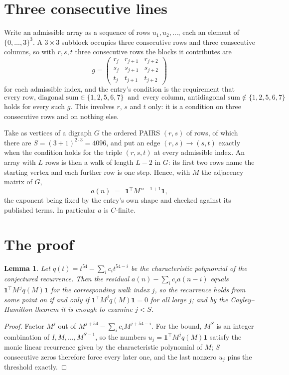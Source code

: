 \documentclass[11pt,a4paper]{article}
\theoremstyle{plain}
\newtheorem{lemma}[theorem]{Lemma}
\theoremstyle{definition}
\begin{document}
\section{Three consecutive lines}

Write an admissible array as a sequence of rows $u_1,u_2,\dots$, each an element of
$\{0,\dots,3\}^{3}$. A $3\times3$ subblock occupies three consecutive rows and
three consecutive columns, so with $r,s,t$ three consecutive rows the blocks it
contributes are
\[
g=\begin{pmatrix}r_j&r_{j+1}&r_{j+2}\\ s_j&s_{j+1}&s_{j+2}\\ t_j&t_{j+1}&t_{j+2}\end{pmatrix}
\]
for each admissible index, and the entry's condition is the requirement that
\[
\text{every row, diagonal sum} \in \{1,2,5,6,7\}\ \text{ and }\ \text{every column, antidiagonal sum} \notin \{1,2,5,6,7\}
\]
holds for every such $g$. This involves $r$, $s$ and $t$ only: it is a condition on
three consecutive rows and on nothing else.

Take as vertices of a digraph $G$ the ordered PAIRS $(r,s)$ of rows, of which there are
$S=(3+1)^{2\cdot3}=4096$, and put an edge $(r,s)\to(s,t)$ exactly when the condition
holds for the triple $(r,s,t)$ at every admissible index. An array with $L$ rows is then a
walk of length $L-2$ in $G$: its first two rows name the starting vertex and each further
row is one step. Hence, with $M$ the adjacency matrix of $G$,
\[
a(n)\;=\;\,\mathbf{1}^{\!\top}M^{\,n-1+1}\mathbf{1},
\]
the exponent being fixed by the entry's own shape and checked against its published terms.
In particular $a$ is $C$-finite.

\section{The proof}

\begin{lemma}\label{lem:crit}
Let $q(t)=t^{54}-\sum_i c_it^{54-i}$ be the characteristic polynomial of the
conjectured recurrence. Then the residual $a(n)-\sum_ic_ia(n-i)$ equals
$\mathbf{1}^{\!\top}M^{\,j}q(M)\mathbf{1}$ for the corresponding walk index
$j$, so the recurrence holds from some point on if and only if
$\mathbf{1}^{\!\top}M^{j}q(M)\mathbf{1}=0$ for all large $j$; and by the
Cayley--Hamilton theorem it is enough to examine $j<S$.
\end{lemma}

\begin{proof}
Factor $M^{j}$ out of $M^{j+54}-\sum_ic_iM^{j+54-i}$. For the bound, $M^{S}$
is an integer combination of $I,M,\dots,M^{S-1}$, so the numbers
$u_j=\mathbf{1}^{\!\top}M^{j}q(M)\mathbf{1}$ satisfy the monic linear recurrence given by
the characteristic polynomial of $M$; $S$ consecutive zeros therefore force every later one,
and the last nonzero $u_j$ pins the threshold exactly.
\end{proof}
\end{document}
